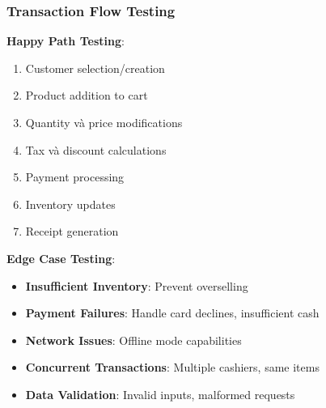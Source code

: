 \documentclass[12pt,a4paper]{article}
\begin{document}
\subsubsection{Transaction Flow Testing}
\textbf{Happy Path Testing}:
\begin{enumerate}
    \item Customer selection/creation
    \item Product addition to cart
    \item Quantity và price modifications
    \item Tax và discount calculations
    \item Payment processing
    \item Inventory updates
    \item Receipt generation
\end{enumerate}

\textbf{Edge Case Testing}:
\begin{itemize}
    \item \textbf{Insufficient Inventory}: Prevent overselling
    \item \textbf{Payment Failures}: Handle card declines, insufficient cash
    \item \textbf{Network Issues}: Offline mode capabilities
    \item \textbf{Concurrent Transactions}: Multiple cashiers, same items
    \item \textbf{Data Validation}: Invalid inputs, malformed requests
\end{itemize}
\end{document}
